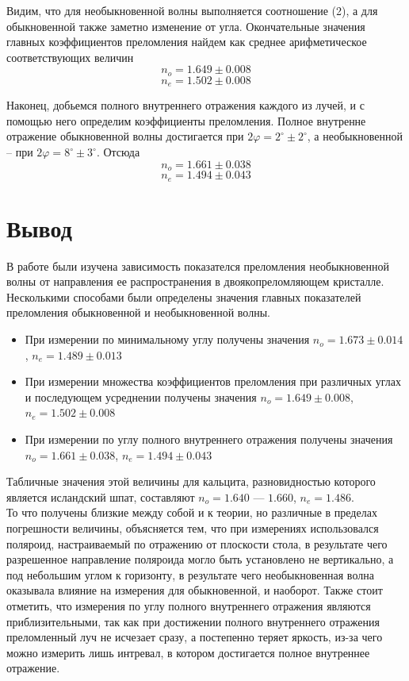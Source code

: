 \documentclass[a4paper,12pt]{article}
\begin{document}
\noindent Видим, что для необыкновенной волны выполняется соотношение (2), а для обыкновенной также заметно изменение от угла. Окончательные значения главных коэффициентов преломления найдем как среднее арифметическое соответствующих величин
$$
n_o = 1.649 \pm 0.008
$$
$$
n_e = 1.502 \pm 0.008
$$

\noindent Наконец, добьемся полного внутреннего отражения каждого из лучей, и с помощью него определим коэффициенты преломления. Полное внутренне отражение обыкновенной волны достигается при $2\varphi = 2^\circ\pm2^\circ$, а необыкновенной -- при $2\varphi = 8^\circ\pm3^\circ$. Отсюда
$$
n_o = 1.661\pm0.038
$$
$$
n_e = 1.494\pm0.043
$$

\section*{Вывод}
В работе были изучена зависимость показателся преломления необыкновенной волны от направления ее распространения в двоякопреломляющем кристалле. Несколькими способами были определены значения главных показателей преломления обыкновенной и необыкновенной волны. 
\begin{itemize}
    \item При измерении по минимальному углу получены значения $n_o = 1.673 \pm 0.014$, $n_e = 1.489 \pm 0.013$
    \item При измерении множества коэффициентов преломления при различных углах и последующем усреднении получены значения $n_o = 1.649 \pm 0.008$, $n_e = 1.502 \pm 0.008$
    \item При измерении по углу полного внутреннего отражения получены значения $n_o = 1.661\pm0.038$, $n_e = 1.494\pm0.043$
\end{itemize}
Табличные значения этой величины для кальцита, разновидностью которого является исландский шпат, составляют $n_o = 1.640 \textit{ --- } 1.660$, $n_e = 1.486$. \\
\noindent То что получены близкие между собой и к теории, но различные в пределах погрешности величины, объясняется тем, что при измерениях использовался поляроид, настраиваемый по отражению от плоскости стола, в результате чего разрешенное направление поляроида могло быть установлено не вертикально, а под небольшим углом к горизонту, в результате чего необыкновенная волна оказывала влияние на измерения для обыкновенной, и наоборот. Также стоит отметить, что измерения по углу полного внутреннего отражения являются приблизительными, так как при достижении полного внутреннего отражения преломленный луч не исчезает сразу, а постепенно теряет яркость, из-за чего можно измерить лишь интревал, в котором достигается полное внутреннее отражение.
\end{document}
